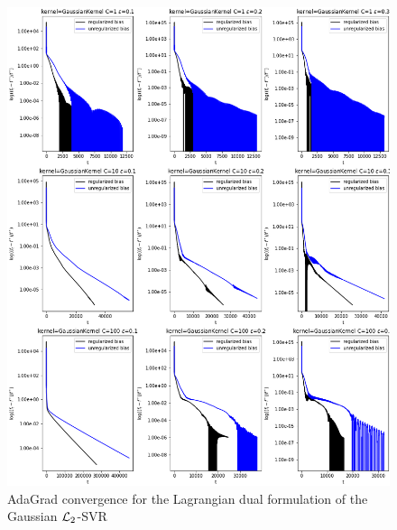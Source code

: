 \begin{figure}[H]
	\centering
	\includegraphics[scale=0.55]{img/gaussian_lagrangian_dual_l2_svr_loss_history}
	\caption{AdaGrad convergence for the Lagrangian dual formulation of the Gaussian $\protect \mathcal{L}_2$-SVR}
	\label{fig:gaussian_lagrangian_dual_l2_svr_loss_history}
\end{figure}
